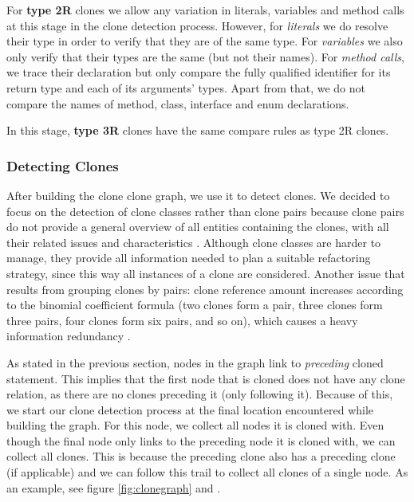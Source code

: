 For \textbf{type 2R} clones we allow any variation in literals, variables and method calls at this stage in the clone detection process. However, for \textit{literals} we do resolve their type in order to verify that they are of the same type. For \textit{variables} we also only verify that their types are the same (but not their names). For \textit{method calls}, we trace their declaration but only compare the fully qualified identifier for its return type and each of its arguments' types. Apart from that, we do not compare the names of method, class, interface and enum declarations.

In this stage, \textbf{type 3R} clones have the same compare rules as type 2R clones.

\subsubsection{Detecting Clones} \label{sec:detectingclones}
After building the clone clone graph, we use it to detect clones. We decided to focus on the detection of clone classes rather than clone pairs because clone pairs do not provide a general overview of all entities containing the clones, with all their related issues and characteristics \cite{fontana2012duplicated}. Although clone classes are harder to manage, they provide all information needed to plan a suitable refactoring strategy, since this way all instances of a clone are considered. Another issue that results from grouping clones by pairs: clone reference amount increases according to the binomial coefficient formula (two clones form a pair, three clones form three pairs, four clones form six pairs, and so on), which causes a heavy information redundancy \cite{fontana2012duplicated}.

As stated in the previous section, nodes in the graph link to \textit{preceding} cloned statement. This implies that the first node that is cloned does not have any clone relation, as there are no clones preceding it (only following it). Because of this, we start our clone detection process at the final location encountered while building the graph. For this node, we collect all nodes it is cloned with. Even though the final node only links to the preceding node it is cloned with, we can collect all clones. This is because the preceding clone also has a preceding clone (if applicable) and we can follow this trail to collect all clones of a single node. As an example, see figure \ref{fig:clonegraph} and \label{fig:clonegraph2}.

